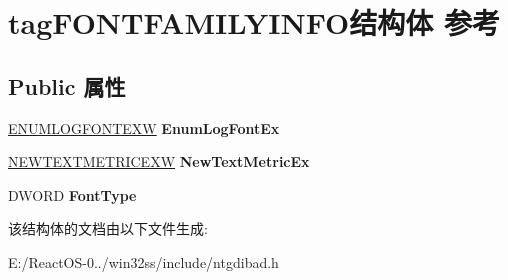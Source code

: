 \hypertarget{structtag_f_o_n_t_f_a_m_i_l_y_i_n_f_o}{}\section{tag\+F\+O\+N\+T\+F\+A\+M\+I\+L\+Y\+I\+N\+F\+O结构体 参考}
\label{structtag_f_o_n_t_f_a_m_i_l_y_i_n_f_o}
\subsection*{Public 属性}
\begin{DoxyCompactItemize}
\item 
\mbox{\label{structtag_f_o_n_t_f_a_m_i_l_y_i_n_f_o_afc56925fde53eaf4c475abf0275d3368}} 
\hyperlink{structtag_e_n_u_m_l_o_g_f_o_n_t_e_x_w}{E\+N\+U\+M\+L\+O\+G\+F\+O\+N\+T\+E\+XW} {\bfseries Enum\+Log\+Font\+Ex}
\item 
\mbox{\label{structtag_f_o_n_t_f_a_m_i_l_y_i_n_f_o_a898b39be2a962c2125c316b331f2bc6a}} 
\hyperlink{structtag_n_e_w_t_e_x_t_m_e_t_r_i_c_e_x_w}{N\+E\+W\+T\+E\+X\+T\+M\+E\+T\+R\+I\+C\+E\+XW} {\bfseries New\+Text\+Metric\+Ex}
\item 
\mbox{\label{structtag_f_o_n_t_f_a_m_i_l_y_i_n_f_o_aaa76c7723aab8a223c96665e04638c15}} 
D\+W\+O\+RD {\bfseries Font\+Type}
\end{DoxyCompactItemize}


该结构体的文档由以下文件生成\+:\begin{DoxyCompactItemize}
\item 
E\+:/\+React\+O\+S-\/0../win32ss/include/ntgdibad.\+h\end{DoxyCompactItemize}
